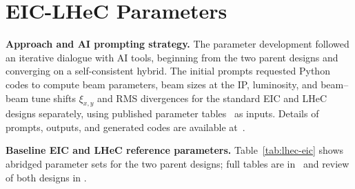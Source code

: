 \documentclass[%
               refpage,       %
               biblatex,     %
               hyphens,      %
               ]{jacow}
\begin{document}



\section{EIC-LHeC Parameters}

\textbf{Approach and AI prompting strategy.}
The parameter development followed an iterative dialogue with AI tools, 
beginning from the two parent designs and converging on a self-consistent 
hybrid. The initial prompts requested Python codes to compute beam parameters, 
beam sizes at the IP, luminosity, and beam--beam tune shifts $\xi_{x,y}$ and 
RMS divergences for the standard EIC and LHeC designs separately, using 
published parameter tables~\cite{EIC-pars,ESPP-LHeC} as inputs. Details of 
prompts, outputs, and generated codes are available at~\cite{GitHub}.


\textbf{Baseline EIC and LHeC reference parameters.}
Table~\ref{tab:lhec-eic} shows abridged parameter sets for the two parent 
designs; full tables are in~\cite{EIC-pars,ESPP-LHeC} and review of both designs in \cite{10.3389/fphy.2022.886473}.

\end{document}
